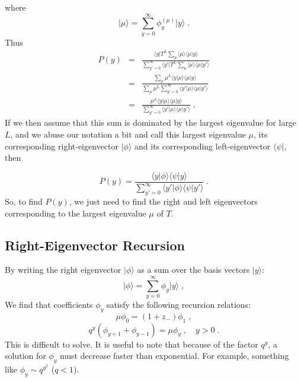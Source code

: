 \documentclass[a4paper,10pt]{article}
\newcommand{\py}{P(y)}
\newcommand{\bra}[1]{\langle #1 \vert}
\newcommand{\ket}[1]{\vert #1 \rangle}
\newcommand{\braket}[2]{\langle #1 \vert #2 \rangle}
\begin{document}
where
\begin{equation}
  \ket{\mu} = \sum_{y=0}^\infty \phi^{(\mu)}_y \ket{y} \;.
\end{equation}
Thus
\begin{eqnarray}
  \py &  = & \frac{\bra{y} T^L \sum_\mu \ket{\mu} \braket{\mu}{y}}{\sum_{y'=0}^\infty \bra{y'} T^L \sum_\mu \ket{\mu} \braket{\mu}{y'}} \nonumber \\
      &  = & \frac{ \sum_\mu \mu^L \braket{y}{\mu} \braket{\mu}{y}}{\sum_\mu \mu^L \sum_{y'=0}^\infty \braket{y'}{\mu} \braket{\mu}{y'}}\nonumber \\
      &  = & \frac{\mu^L \braket{y}{\mu} \braket{\mu}{y}}{\sum_{y'=0}^\infty \braket{y'}{\mu} \braket{\mu}{y'}}  \;.
\end{eqnarray}
If we then assume that this sum is dominated by the largest eigenvalue for large $L$, and we abuse our notation a bit and call this largest eigenvalue $\mu$, its corresponding right-eigenvector $\ket{\phi}$ and its corresponding left-eigenvector $\bra{\psi}$, then 

\begin{equation}
  \py  =  \frac{ \braket{y}{\phi} \braket{\psi}{y}}{\sum_{y'=0}^\infty \braket{y'}{\phi} \braket{\psi}{y'}}  \;.
\end{equation}
So, to find $\py$, we just need to find the right and left eigenvectors corresponding to the largest eigenvalue $\mu$ of $T$.

\subsection{Right-Eigenvector Recursion}

By writing the right eigenvector $\ket{\phi}$ as a sum over the basis vectors $\ket{y}$:
\begin{equation}\label{eq:phi_basis}
  \ket{\phi} = \sum_{y=0}^\infty \phi_y \ket{y} \;,
\end{equation}
We find that  coefficients $\phi_y$ satisfy the following recursion relations:
\begin{equation}\label{eq:recursion01}
  \mu \phi_0 = (1+z_-)\phi_1 \;,
\end{equation}
\begin{equation}\label{eq:recursion}
  q^y (\phi_{y+1} + \phi_{y-1}) = \mu \phi_y \;, \quad y>0 \;.
\end{equation}
This is difficult to solve. It is useful to note that because of the factor $q^y$, a solution for $\phi_y$ must decrease faster than exponential. For example, something like $\phi_y \sim q^{y^2}$ ($q<1$).
\end{document}
